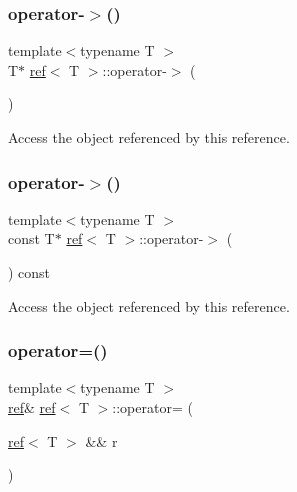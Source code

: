 \subsubsection{\texorpdfstring{operator-\/$>$()}{operator->()}\hspace{0.1cm}{\footnotesize\ttfamily [1/2]}}
{\footnotesize\ttfamily template$<$typename T $>$ \\
T$\ast$ \mbox{\hyperlink{classref}{ref}}$<$ T $>$\+::operator-\/$>$ (\begin{DoxyParamCaption}{ }\end{DoxyParamCaption})\hspace{0.3cm}{\ttfamily [inline]}}



Access the object referenced by this reference. 

\mbox{\label{classref_a2b60a27dafb793f808195c2ddfd8d013}} 
\subsubsection{\texorpdfstring{operator-\/$>$()}{operator->()}\hspace{0.1cm}{\footnotesize\ttfamily [2/2]}}
{\footnotesize\ttfamily template$<$typename T $>$ \\
const T$\ast$ \mbox{\hyperlink{classref}{ref}}$<$ T $>$\+::operator-\/$>$ (\begin{DoxyParamCaption}{ }\end{DoxyParamCaption}) const\hspace{0.3cm}{\ttfamily [inline]}}



Access the object referenced by this reference. 

\mbox{\label{classref_aed9cb8611b7e85e2a3ee5d05b13b9a0b}} 
\subsubsection{\texorpdfstring{operator=()}{operator=()}\hspace{0.1cm}{\footnotesize\ttfamily [1/3]}}
{\footnotesize\ttfamily template$<$typename T $>$ \\
\mbox{\hyperlink{classref}{ref}}\& \mbox{\hyperlink{classref}{ref}}$<$ T $>$\+::operator= (\begin{DoxyParamCaption}\item[{\mbox{\hyperlink{classref}{ref}}$<$ T $>$ \&\&}]{r }\end{DoxyParamCaption})\hspace{0.3cm}{\ttfamily [inline]}}



